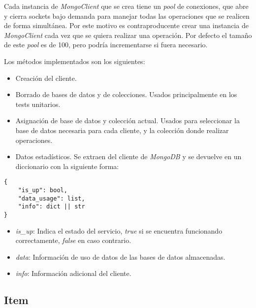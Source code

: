 Cada instancia de \textit{MongoClient} que se crea tiene un \textit{pool} de conexiones, que abre y cierra sockets bajo demanda para manejar todas las operaciones que se realicen de forma simultánea. Por este motivo es contraproducente crear una instancia de \textit{MongoClient} cada vez que se quiera realizar una operación. Por defecto el tamaño de este \textit{pool} es de 100, pero podría incrementarse si fuera necesario.

\bigskip
Los métodos implementados son los siguientes:
\begin{itemize}
	\item Creación del cliente.
	\item Borrado de bases de datos y de colecciones. Usados principalmente en los tests unitarios.
	\item Asignación de base de datos y colección actual. Usados para seleccionar la base de datos necesaria para cada cliente, y la colección donde realizar operaciones.
	\item Datos estadísticos. Se extraen del cliente de \textit{MongoDB} y se devuelve en un diccionario con la siguiente forma:
\end{itemize}

\begin{lstlisting}
{
	"is_up": bool,
	"data_usage": list,
	"info": dict || str
}
\end{lstlisting}

\begin{itemize}
	\item \textit{is\_up}: Indica el estado del servicio, \textit{true} si se encuentra funcionando correctamente, \textit{false} en caso contrario.
	\item \textit{data}: Información de uso de datos de las bases de datos almacenadas.
	\item \textit{info}: Información adicional del cliente.
\end{itemize}



\subsection{Item}

